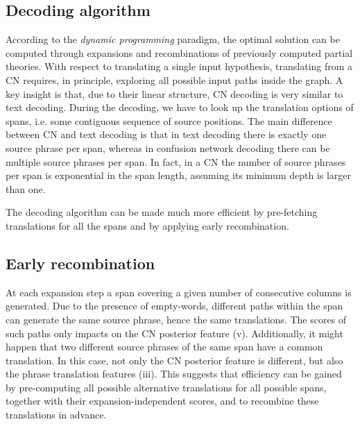 \documentclass[11pt]{report}
\theoremstyle{plain}
\begin{document}
{\subsection{Decoding algorithm}
\label{sec:decoding}
\noindent
According  to  the {\em  dynamic  programming}  paradigm, the  optimal
solution can be computed through expansions and recombinations of  
previously computed  partial  theories.  With respect to translating a
single input hypothesis, translating from a CN requires, 
in principle, exploring all possible input paths inside the graph. 
A key insight is that, due to their linear structure, CN
decoding is very similar to text decoding.  During the
decoding, we have to look up the translation options of spans, i.e. some
contiguous sequence of source positions.  The main
difference between CN and text decoding is that in text
decoding there is exactly one source phrase per span, whereas in
confusion network decoding there can be multiple source phrases per
span.  In fact, in a CN the number of source phrases
per span is exponential in the span length, assuming its minimum depth is larger than one.

\noindent
The decoding algorithm can be made much more efficient by 
pre-fetching translations for all the spans and by applying  early recombination. 

\subsection{Early recombination}
\label{sec:early-rec}
\noindent
At each expansion step  a span covering a given number of consecutive columns is generated. 
Due to the presence of empty-words, different paths within the span can 
generate the same source phrase, hence the same translations. The scores of such 
paths only impacts on the CN posterior feature (v).  Additionally, it might happen that two 
different source phrases of the same span have a common translation. In this case, not only the CN 
posterior feature is different, but also the phrase translation features (iii).
This  suggests that efficiency can be gained by pre-computing all possible alternative
 translations for all possible spans, together with their expansion-independent scores, 
 and to recombine these translations in advance.  
  
}
\end{document}
